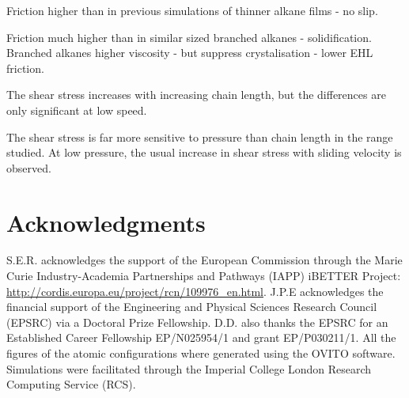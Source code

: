 \documentclass[aps,prb,reprint,superscriptaddress, a4paper]{revtex4-1}
\begin{document}
Friction higher than in previous simulations of thinner alkane films - no slip.

Friction much higher than in similar sized branched alkanes - solidification. Branched alkanes higher viscosity - but suppress crystalisation - lower EHL friction.

The shear stress increases with increasing chain length, but the differences are only significant at low speed.

The shear stress is far more sensitive to pressure than chain length in the range studied. At low pressure, the usual increase in shear stress with sliding velocity is observed. 

\section*{Acknowledgments}

S.E.R. acknowledges the support of the European Commission through the Marie Curie Industry-Academia Partnerships and Pathways (IAPP) iBETTER Project: \url{http://cordis.europa.eu/project/rcn/109976_en.html}. J.P.E acknowledges the financial support of the Engineering and Physical Sciences Research Council (EPSRC) via a Doctoral Prize Fellowship. D.D. also thanks the EPSRC for an Established Career Fellowship EP/N025954/1 and grant EP/P030211/1. All the figures of the atomic configurations where generated using the OVITO\cite{Stukowski2010b} software. Simulations were facilitated through the Imperial College London Research Computing Service (RCS).


\end{document}
